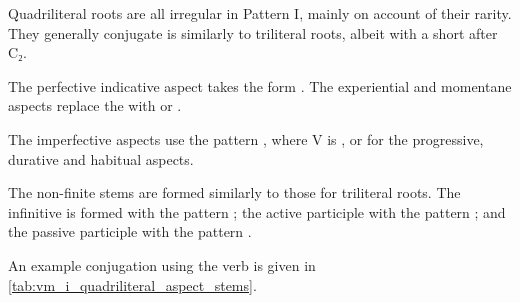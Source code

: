 \documentclass[grammar]{subfiles}
\begin{document}
Quadriliteral roots are all irregular in Pattern I, mainly on account of their
rarity.  They generally conjugate is similarly to triliteral roots, albeit with
a short  after C₂.

The perfective indicative aspect takes the form . The
experiential and momentane aspects replace the  with  or .

The imperfective aspects use the pattern , where V is
,  or  for the progressive, durative and habitual aspects.

The non-finite stems are formed similarly to those for triliteral roots.  The
infinitive is formed with the pattern ; the active participle
with the pattern ; and the passive participle with the pattern
.

An example conjugation using the verb  is given in
\cref{tab:vm_i_quadriliteral_aspect_stems}. 

\begin{table}[h!]\small\capstart
  \centering
  \\
  \caption{Pattern I quadriliteral stems\label{tab:vm_i_quadriliteral_aspect_stems}}
\end{table}
\end{document}
